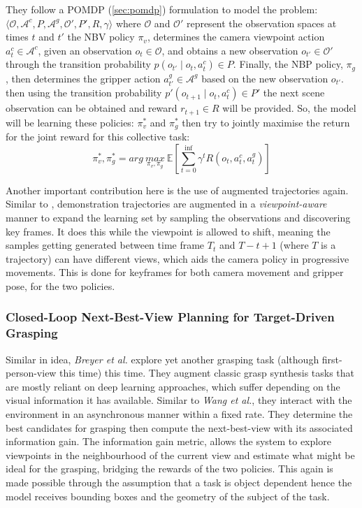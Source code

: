 They follow a POMDP (\ref{sec:pomdp}) formulation to model the problem:
\(
  \langle \mathcal{O}, \mathcal{A}^c, P, \mathcal{A}^g, \mathcal{O}', P', R, \gamma \rangle
\) where $\mathcal{O}$ and $\mathcal{O}'$ represent the observation spaces at times $t$ and $t'$ the NBV policy $\pi_v$, determines the camera viewpoint action $a_t^c \in \mathcal{A}^c$, given an observation $o_t \in \mathcal{O}$, and obtains a new observation $o_{t'} \in \mathcal{O}'$ through the transition probability $p\left(o_{t'} \mid o_t, a_t^c\right) \in P$. Finally, the NBP policy, $\pi_g$, then determines the gripper action $a^g_{t'} \in \mathcal{A}^g$ based on the new observation $o_{t'}$. then using the transition probability $p'\left(o_{t+1} \mid o_t, a^c_t\right) \in P'$ the next scene observation can be obtained and reward $r_{t+1} \in R$ will be provided. So, the model will be learning these policies: $\pi^*_v$ and $\pi^*_g$ then try to jointly maximise the return for the joint reward for this collective task: 
\[
  \pi_v^*, \pi_g^* = 
  arg~\underset{\pi_v, \pi_g}{max} 
  ~\mathbb{E}
  \left[
    \sum_{t=0}^{\inf}{\gamma^t R(o_t, a^c_t, a^g_t)}
  \right]
\]

Another important contribution here is the use of augmented trajectories again. Similar to \cite{papagiannis2024milesmakingimitationlearning}, demonstration trajectories are augmented in a \emph{viewpoint-aware} manner to expand the learning set by sampling the observations and discovering key frames. It does this while the viewpoint is allowed to shift, meaning the samples getting generated between time frame $T_t$ and $T-{t+1}$ (where $T$ is a trajectory) can have different views, which aids the camera policy in progressive movements. This is done for keyframes for both camera movement and gripper pose, for the two policies.

\subsubsection{Closed-Loop Next-Best-View Planning for Target-Driven Grasping}
Similar in idea, \emph{Breyer et al.} explore yet another grasping task \cite{breyer2022closedloopnextbestviewplanningtargetdriven} (although first-person-view this time) this time. They augment classic grasp synthesis tasks that are mostly reliant on deep learning approaches, which suffer depending on the visual information it has available. Similar to \emph{Wang et al.}, they interact with the environment in an asynchronous manner within a fixed rate. They determine the best candidates for grasping then compute the next-best-view with its associated information gain. 
The information gain metric, allows the system to explore viewpoints in the neighbourhood of the current view and estimate what might be ideal for the grasping, bridging the rewards of the two policies. This again is made possible through the assumption that a task is object dependent hence the model receives bounding boxes and the geometry of the subject of the task.

